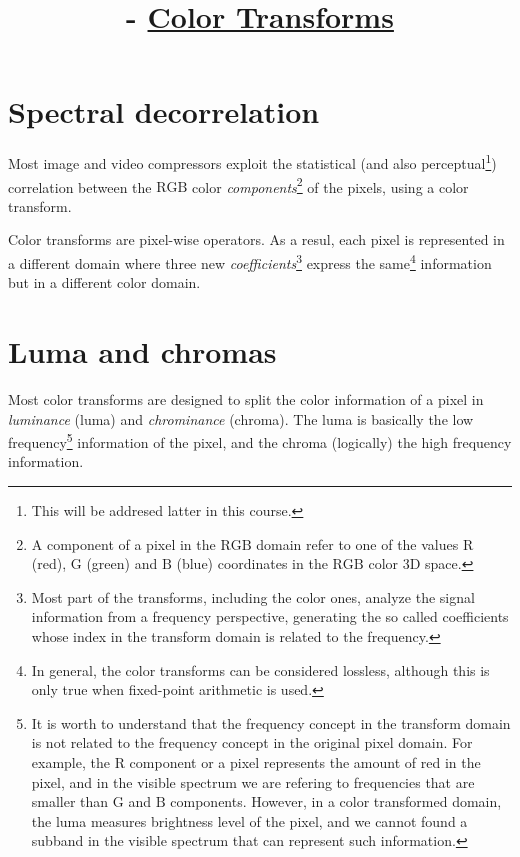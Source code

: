 

\title{\SM{} - \href{https://sistemas-multimedia.github.io/contents/color_transforms}{Color Transforms}}

\maketitle
\tableofcontents

\section{Spectral decorrelation}

Most image and video compressors exploit the statistical (and also
perceptual\footnote{This will be addresed latter in this course.})
correlation between the $\text{RGB}$ color
\emph{components}\footnote{A component of a pixel in the $\text{RGB}$
domain refer to one of the values $\text{R}$ (red), $\text{G}$ (green)
and $\text{B}$ (blue) coordinates in the $\text{RGB}$ color 3D space.}
of the pixels, using a color transform.

Color transforms are pixel-wise operators. As a resul, each pixel is
represented in a different domain where three new
\emph{coefficients}\footnote{Most part of the transforms, including
the color ones, analyze the signal information from a frequency
perspective, generating the so called coefficients whose index in the
transform domain is related to the frequency.} express the
same\footnote{In general, the color transforms can be considered
lossless, although this is only true when fixed-point arithmetic is
used.} information but in a different color domain.

\section{Luma and chromas}

Most color transforms are designed to split the color information of a
pixel in \emph{luminance} (luma) and \emph{chrominance} (chroma). The
luma is basically the low frequency\footnote{It is worth to understand
that the frequency concept in the transform domain is not related to
the frequency concept in the original pixel domain. For example, the
$\text{R}$ component or a pixel represents the amount of red in the
pixel, and in the visible spectrum we are refering to frequencies that
are smaller than $\text{G}$ and $\text{B}$ components. However, in a
color transformed domain, the luma measures brightness level of the
pixel, and we cannot found a subband in the visible spectrum that can
represent such information.} information of the pixel, and the chroma
(logically) the high frequency information.

